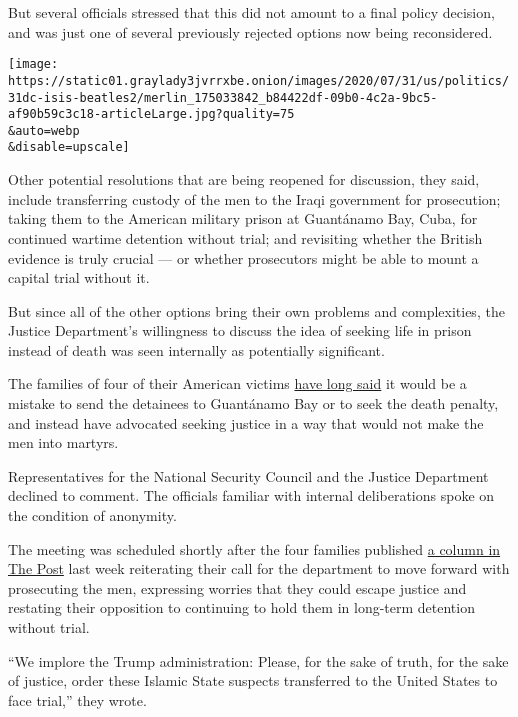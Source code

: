 But several officials stressed that this did not amount to a final
policy decision, and was just one of several previously rejected options
now being reconsidered.

\texttt{[image: https://static01.graylady3jvrrxbe.onion/images/2020/07/31/us/politics/31dc-isis-beatles2/merlin\_175033842\_b84422df-09b0-4c2a-9bc5-af90b59c3c18-articleLarge.jpg?quality=75\\\&auto=webp\\\&disable=upscale]}

Other potential resolutions that are being reopened for discussion, they
said, include transferring custody of the men to the Iraqi government
for prosecution; taking them to the American military prison at
Guantánamo Bay, Cuba, for continued wartime detention without trial; and
revisiting whether the British evidence is truly crucial --- or whether
prosecutors might be able to mount a capital trial without it.

But since all of the other options bring their own problems and
complexities, the Justice Department's willingness to discuss the idea
of seeking life in prison instead of death was seen internally as
potentially significant.

The families of four of their American victims
\href{https://www.nytimes3xbfgragh.onion/2018/02/16/opinion/justice-isis-trial.html}{have
long said} it would be a mistake to send the detainees to Guantánamo Bay
or to seek the death penalty, and instead have advocated seeking justice
in a way that would not make the men into martyrs.

Representatives for the National Security Council and the Justice
Department declined to comment. The officials familiar with internal
deliberations spoke on the condition of anonymity.

The meeting was scheduled shortly after the four families published
\href{https://www.washingtonpost.com/opinions/2020/07/23/our-children-were-killed-by-islamic-state-members-they-must-face-trial/}{a
column in The Post} last week reiterating their call for the department
to move forward with prosecuting the men, expressing worries that they
could escape justice and restating their opposition to continuing to
hold them in long-term detention without trial.

``We implore the Trump administration: Please, for the sake of truth,
for the sake of justice, order these Islamic State suspects transferred
to the United States to face trial,'' they wrote.

